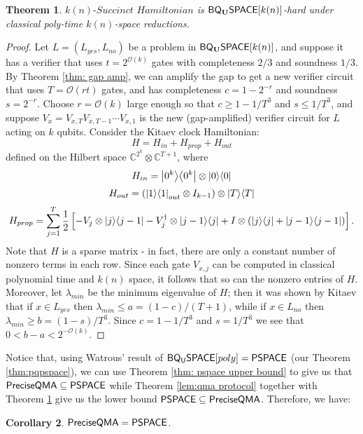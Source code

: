 \documentclass[11pt]{article}
\newtheorem{theorem}{Theorem}
\newtheorem{corollary}[theorem]{Corollary}
\theoremstyle{definition}
\theoremstyle{remark}
\theoremstyle{definition}
\newcommand\BQSPACE{{\sf{BQ_{U}SPACE}}}
\newcommand\PSPACE{{\sf{PSPACE}}}
\newcommand\QMAexp{{\sf{PreciseQMA}}}
\newcommand\spechamiltonian[1]{#1\textit{-Succinct Hamiltonian}}
\newcommand{\classfont}{\sf}
\newcommand{\Unitary}{\mathbf{U}}
\newcommand{\unitaryBQSPACE}[1]{{\classfont{BQ}_\Unitary\classfont{SPACE}}[#1]}
\newcommand\bigoh{\mathcal{O}}
\begin{document}
\begin{theorem}\label{thm: specham-hardness}
$\spechamiltonian{k(n)}$ is $\unitaryBQSPACE{k(n)}$-hard under classical poly-time $k(n)$-space reductions.
\end{theorem}
\begin{proof}
Let $L=(L_{yes},L_{no})$ be a problem in $\unitaryBQSPACE{k(n)}$, and suppose it has a verifier that uses $t=2^{\bigoh(k)}$ gates with completeness $2/3$ and soundness $1/3$. By Theorem \ref{thm: gap amp}, we can   amplify the gap to get a new verifier circuit that uses $T=\mathcal{O}(rt)$ gates, and has completeness $c=1-2^{-r}$ and soundness $s=2^{-r}$. Choose $r=\bigoh(k)$ large enough so that $c \ge 1 - 1/T^3$ and $s \le 1/T^3$, and suppose $V_x=V_{x,T}V_{x,T-1}\cdots V_{x,1}$ is the new (gap-amplified) verifier circuit for $L$ acting on $k$ qubits. Consider the Kitaev clock Hamiltonian:
\begin{equation}
H = H_{in} + H_{prop} + H_{out}
\end{equation}
defined on the Hilbert space $\mathbb{C}^{2^k} \otimes \mathbb{C}^{T+1}$, where
\begin{equation}
H_{in} = {\left\vert{0^k}\right\rangle}{\left\langle{0^k}\right\vert} \otimes {\left\vert{0}\right\rangle}{\left\langle{0}\right\vert}
\end{equation}
\begin{equation}
H_{out} = ({\left\vert{1}\right\rangle}{\left\langle{1}\right\vert}_{out} \otimes I_{k-1}) \otimes {\left\vert{T}\right\rangle}{\left\langle{T}\right\vert}
\end{equation}
\begin{equation}
H_{prop} = \sum_{j=1}^T \frac{1}{2} \left[ - V_j \otimes {\left\vert{j}\right\rangle}{\left\langle{j-1}\right\vert} - V_j^\dagger \otimes {\left\vert{j-1}\right\rangle}{\left\langle{j}\right\vert} + I \otimes ({\left\vert{j}\right\rangle}{\left\langle{j}\right\vert} + {\left\vert{j-1}\right\rangle}{\left\langle{j-1}\right\vert}) \right].
\end{equation}
Note that $H$ is a sparse matrix - in fact, there are only a constant number of nonzero terms in each row. Since each gate $V_{x,j}$ can be computed in classical polynomial time and $k(n)$ space, it follows that so can the nonzero entries of $H$. Moreover, let $\lambda_{min}$ be the minimum eigenvalue of $H$; then it was shown by Kitaev \cite{ksv02} that if $x \in L_{yes}$ then $\lambda_{min} \le a = (1-c)/(T+1)$, while if $x \in L_{no}$ then $\lambda_{min} \ge b = (1-s)/T^3$. Since $c = 1-1/T^3$ and $s = 1/T^3$ we see that $0 < b-a < 2^{-\mathcal{O}(k)}$. 
\end{proof}

Notice that, using Watrous' result of $\BQSPACE[poly]=\PSPACE$ (our Theorem \ref{thm:pqpspace}), we can use Theorem \ref{thm: pspace upper bound} to give us that $\QMAexp\subseteq\PSPACE$ while Theorem \ref{lem:qma protocol} together with Theorem \ref{thm: specham-hardness} give us the lower bound $\PSPACE\subseteq\QMAexp$.  Therefore, we have:
\begin{corollary} $\QMAexp=\PSPACE$. \end{corollary}
\end{document}
